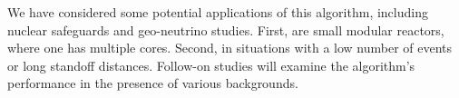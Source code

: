 \documentclass[tightenlines,
twocolumn,prl,notitlepage,nofootinbib,preprintnumbers,longbibliography]{revtex4-1}
\begin{document}

We have considered some potential applications of this algorithm, including nuclear safeguards and geo-neutrino studies. First, are small modular reactors, where one has multiple cores. Second, in situations with a low number of events or long standoff distances. Follow-on studies will examine the algorithm's performance in the presence of various backgrounds.




\end{document}
